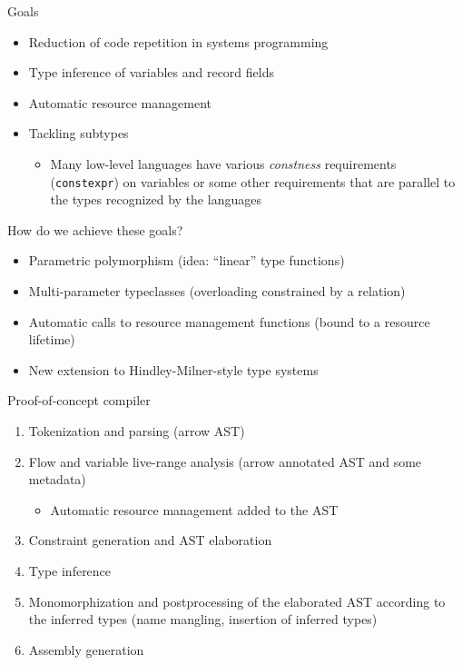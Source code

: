 \documentclass[aspectratio=169]{beamer}
\newcommand{\xxx}[1]{\textcolor{red!}{#1}}
\newcommand{\li}[1]{\lstinline{#1}}
\begin{document}
\begin{frame}{Goals}
  \begin{itemize}
    \item Reduction of code repetition in systems programming
    \item Type inference of variables and record fields
    \item Automatic resource management
    \item Tackling subtypes
      \begin{itemize}
        \item Many low-level languages have various \emph{constness} requirements (\li{constexpr}) on variables or some other requirements that are parallel to the types recognized by the languages
      \end{itemize}
  \end{itemize}
  
  \pause
  
  How do we achieve these goals?
  
  \pause
  
  \begin{itemize}
    \item Parametric polymorphism (idea: ``linear'' type functions)
    \item Multi-parameter typeclasses (overloading constrained by a relation)
    \item Automatic calls to resource management functions (bound to a resource lifetime)
    \item New extension to Hindley-Milner-style type systems
  \end{itemize}
\end{frame}

\begin{frame}{Proof-of-concept compiler}
  \begin{enumerate}
    \item Tokenization and parsing (\xxx{arrow} AST)
    \item Flow and variable live-range analysis (\xxx{arrow} annotated AST and \xxx{some metadata})
    \begin{itemize}
      \color{olive}
      \item Automatic resource management added to the AST
    \end{itemize}
    \item Constraint generation and AST elaboration
    \item Type inference
    \item Monomorphization and postprocessing of the elaborated AST according to the inferred types (name mangling, insertion of inferred types)
    \item Assembly generation
  \end{enumerate}
\end{frame}
\end{document}
